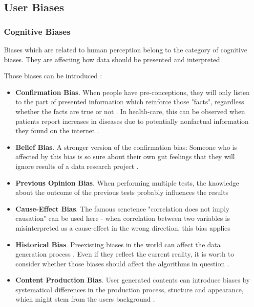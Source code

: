 \documentclass[12pt, a4paper, oneside]{book}   	%
\renewcommand{\paragraph}[1]{%
	\subsubsection*{#1}%
}
\begin{document}
			
			\subsection{User Biases}
			
			\paragraph{Cognitive Biases}
			Biases which are related to human perception belong to the category of cognitive biases. They are affecting how data should be presented and interpreted \autocite{Mester_2017}
			
			Those biases can be introduced :
			\begin{itemize}
				\item \textbf{Confirmation Bias}. When people have pre-conceptions, they will only listen to the part of presented information which reinforce those "facts", regardless whether the facts are true or not \autocite{Mester_2017}. In health-care, this can be observed when patients report increases in diseases due to potentially nonfactual information they found on the internet \autocite{Chakraborty_2024, c15, c14}.
				\item \textbf{Belief Bias}. A stronger version of the confirmation bias: Someone who is affected by this bias is so sure about their own gut feelings that they will ignore results of a data research project \autocite{Mester_2017}.
				\item \textbf{Previous Opinion Bias}. When performing multiple tests, the knowledge about the outcome of the previous tests probably influences the results \autocite{Chakraborty_2024}
				\item \textbf{Cause-Effect Bias}. The famous senctence "correlation does not imply causation" can be used here - when correlation between two variables is misinterpreted as a cause-effect in the wrong direction, this bias applies  \autocite{Mester_2017}
				\item \textbf{Historical Bias}. Preexisting biases in the world can affect the data generation process \autocite{M144_Suresh_2021}. Even if they reflect the current reality, it is worth to consider whether those biases should affect the algorithms in question \autocite{Mehrabi_2021}.
				\item \textbf{Content Production Bias}. User generated contents can introduce biases by systematical differences in the production process, stucture and appearance, which might stem from the users background \autocite{M120_Olteanu_2019}.
			\end{itemize}
			
\end{document}

